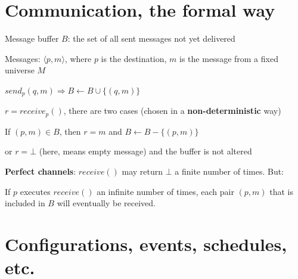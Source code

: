 \documentclass[12pt]{article}
\newcommand{\receive}{\mathit{receive}}
\newcommand{\send}{\mathit{send}}
\begin{document}
\section*{Communication, the formal way}

\BI
\item Message buffer $B$: the set of all sent messages not yet delivered
\item Messages: $\langle p, m \rangle$, where $p$ is the destination, $m$
  is the message from a fixed universe $M$
\item $\send_p(q,m) \Rightarrow B \gets B \cup \{ (q,m) \}$
\item $r=\receive_p()$, there are two cases (chosen in a {\bf non-deterministic} way)
  \BI
    \item If $(p,m) \in B$, then $r=m$ and $B \gets B - \{ (p,m) \}$
    \item or $r = \bot$ (here, means empty message) and the buffer is not
      altered
  \EI
\item \textbf{Perfect channels}:
  $receive()$ may return $\bot$ a finite number of times. But:

  If $p$ executes $receive()$ an infinite number of times, each
  pair $(p,m)$ that is included in $B$ will eventually be received.
\EI

\section*{Configurations, events, schedules, etc.}
\end{document}
